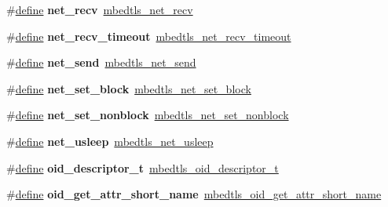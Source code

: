 \begin{DoxyCompactItemize}
\item 
\mbox{\label{compat-1_83_8h_adf9d9d0596a9a3dbdd5e0ed56be6bdf4}} 
\#\hyperlink{structdefine}{define} {\bfseries net\+\_\+recv}~\hyperlink{net__sockets_8h_a03af351ec420bbeb5e91357abcfb3663}{mbedtls\+\_\+net\+\_\+recv}
\item 
\mbox{\label{compat-1_83_8h_a5ed9f108a438956d9916ba9dfa57f815}} 
\#\hyperlink{structdefine}{define} {\bfseries net\+\_\+recv\+\_\+timeout}~\hyperlink{net__sockets_8h_a67810154d2328a80b146155d8cdecfd9}{mbedtls\+\_\+net\+\_\+recv\+\_\+timeout}
\item 
\mbox{\label{compat-1_83_8h_ac6979c72f99aeaad801274445ead1f89}} 
\#\hyperlink{structdefine}{define} {\bfseries net\+\_\+send}~\hyperlink{net__sockets_8h_a4841afd0e14f1fd44b82c3a850961ab7}{mbedtls\+\_\+net\+\_\+send}
\item 
\mbox{\label{compat-1_83_8h_a73a9edd9798a8ebd7e2feb0e560e0546}} 
\#\hyperlink{structdefine}{define} {\bfseries net\+\_\+set\+\_\+block}~\hyperlink{net__sockets_8h_aeea4e6fd5ad3167bf8563e61f6f75963}{mbedtls\+\_\+net\+\_\+set\+\_\+block}
\item 
\mbox{\label{compat-1_83_8h_a05582aae7758b9d82e715a75882e17ea}} 
\#\hyperlink{structdefine}{define} {\bfseries net\+\_\+set\+\_\+nonblock}~\hyperlink{net__sockets_8h_a2ee4acdc24ef78c9acf5068a423b8c30}{mbedtls\+\_\+net\+\_\+set\+\_\+nonblock}
\item 
\mbox{\label{compat-1_83_8h_abbd3294c37e3a0d6cbbf1e9b7e975a41}} 
\#\hyperlink{structdefine}{define} {\bfseries net\+\_\+usleep}~\hyperlink{net__sockets_8h_a716044d3c30c449bd68052b7c418ff84}{mbedtls\+\_\+net\+\_\+usleep}
\item 
\mbox{\label{compat-1_83_8h_a6fdb3c04436296c3fb434cae2ecc5d37}} 
\#\hyperlink{structdefine}{define} {\bfseries oid\+\_\+descriptor\+\_\+t}~\hyperlink{structmbedtls__oid__descriptor__t}{mbedtls\+\_\+oid\+\_\+descriptor\+\_\+t}
\item 
\mbox{\label{compat-1_83_8h_a5cdc4a4016526658e6f7d010318d70d1}} 
\#\hyperlink{structdefine}{define} {\bfseries oid\+\_\+get\+\_\+attr\+\_\+short\+\_\+name}~\hyperlink{oid_8h_a027b5bb24a69578666631ffea74064a1}{mbedtls\+\_\+oid\+\_\+get\+\_\+attr\+\_\+short\+\_\+name}

\end{DoxyCompactItemize}
